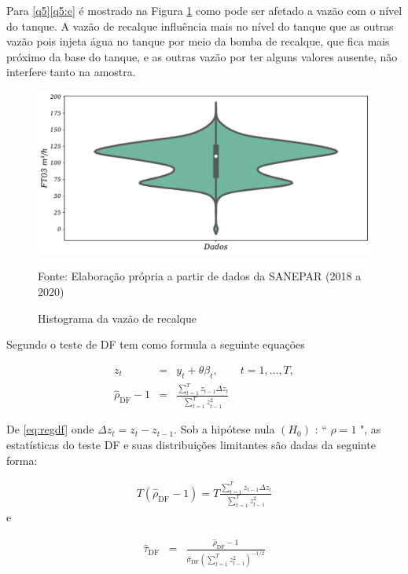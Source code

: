 \begin{itemize}
Para \ref{q5}\ref{q5:e} é mostrado na Figura \ref{fig:ft03} como pode ser afetado a vazão com o nível do tanque. A vazão de recalque influência mais no nível do tanque que as outras vazão pois injeta água no tanque por meio da bomba de recalque, que fica mais próximo da base do tanque, e as outras vazão por ter alguns valores ausente, não interfere tanto na amostra.

\begin{figure}[H]
	\centering
	\caption{Histograma da vazão de recalque}
	\label{fig:ft03}
	\includegraphics[width=1\linewidth]{Resultados/Figuras/ft03}
	
	Fonte: Elaboração própria a partir de dados da SANEPAR (2018 a 2020)
\end{figure}


\end{itemize}

Segundo   o teste de DF tem como formula a seguinte equações

\begin{eqnarray}
	z_t&=& y_t+\theta \beta_t, \qquad t=1,\ldots, T, \label{eq:df3}\\	
\hat{\rho}_{\mathrm{DF}}-1&=&\frac{\sum_{t=1}^T z_{t-1} \Delta z_t}{\sum_{t=1}^T z_{t-1}^2} \label{eq:regdf}
\end{eqnarray}

De \eqref{eq:regdf} onde $\Delta z_t=z_t-z_{t-1}$. Sob a hipótese nula $\left(H_0\right)$ : `` $\rho=1$ ", as estatísticas do teste DF e suas distribuições limitantes são dadas da seguinte forma:


\begin{eqnarray}
	T\left(\hat{\rho}_{\mathrm{DF}}-1\right)=T \frac{\sum_{t=1}^T z_{t-1} \Delta z_t}{\sum_{t=1}^T z_{t-1}^2}
\end{eqnarray}
e


\begin{eqnarray}
	\hat{\tau}_{\mathrm{DF}}&=&\frac{\hat{\rho}_{\mathrm{DF}}-1}{\hat{\sigma}_{\mathrm{DF}}\left(\sum_{t=1}^T z_{t-1}^2\right)^{-1 / 2}} \label{eq:df}
\end{eqnarray}

